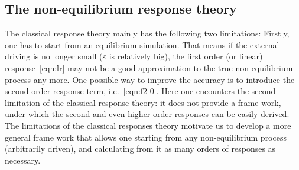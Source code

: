 \documentclass[aip,jcp,a4paper,reprint,onecolumn]{revtex4-1}
\begin{document}
\subsection{The non-equilibrium response theory}

The classical response theory mainly has the following two limitations:
Firstly, one has to start from an equilibrium simulation. That means if the
external driving is no longer small ($\varepsilon$ is relatively big), the
first order (or linear) response~\eqref{eqn:lr} may not be a good approximation to
the true non-equilibrium process any more.
One possible way to improve the accuracy is to introduce the second
order response term, i.e.~\eqref{eqn:f2-0}.
Here one encounters the second limitation of the classical
response theory: it does not provide a frame work, under which
the second and even higher order responses can be easily derived.
The limitations of the classical responses theory motivate us to
develop a more general frame work that allows one starting from any
non-equilibrium process (arbitrarily driven), and calculating from it as many orders of
responses as necessary.
\end{document}
